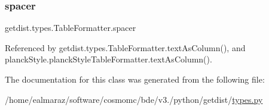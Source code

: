 \subsubsection{\texorpdfstring{spacer}{spacer}}
{\footnotesize\ttfamily getdist.\+types.\+Table\+Formatter.\+spacer}



Referenced by getdist.\+types.\+Table\+Formatter.\+text\+As\+Column(), and planck\+Style.\+planck\+Style\+Table\+Formatter.\+text\+As\+Column().



The documentation for this class was generated from the following file\+:\begin{DoxyCompactItemize}
\item 
/home/ealmaraz/software/cosmomc/bde/v3./python/getdist/\mbox{\hyperlink{types_8py}{types.\+py}}\end{DoxyCompactItemize}
